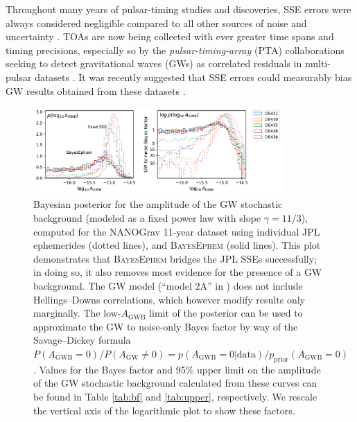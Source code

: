 \documentclass[iop,apj,twocolappendix]{emulateapj}
\begin{document}
Throughout many years of pulsar-timing studies and discoveries, SSE errors were always considered negligible compared to all other sources of noise and uncertainty \citep{1990ApJ...361..300F,2006MNRAS.372.1549E}.
TOAs are now being collected with ever greater time spans and timing precisions, especially so by the \emph{pulsar-timing-array} (PTA) collaborations seeking to detect gravitational waves (GWs) as correlated residuals in multi-pulsar datasets \citep{saz78,det79,fb90,ml13,dcl+16,h13,v+16}.
It was recently suggested that SSE errors could measurably bias GW results obtained from these datasets \citep{2016MNRAS.455.4339T,2019ApJ...876...55R}.
%
\begin{figure}[t]
\begin{center}
    \includegraphics[width=0.85\textwidth]{figures/GWposterior.pdf}
\end{center}
\vspace{-12pt}
    \caption{Bayesian posterior for the amplitude of the GW stochastic background (modeled as a fixed power law with slope $\gamma = 11/3$), computed for the NANOGrav 11-year dataset using individual JPL ephemerides (dotted lines), and \textsc{BayesEphem} (solid lines).
    This plot demonstrates that \textsc{BayesEphem} bridges the JPL SSEs successfully; in doing so, it also removes most evidence for the presence of a GW background.
    The GW model (``model 2A'' in \citealt{2018ApJ...859...47A}) does not include Hellings--Downs correlations, which however modify results only marginally.
    The low-$A_\mathrm{GWB}$ limit of the posterior can be used to approximate the GW to noise-only Bayes factor by way of the Savage--Dickey formula $P(A_\mathrm{GWB}=0)/P(A_\mathrm{GW}\neq 0) = p(A_\mathrm{GWB}=0|\mathrm{data})/p_\mathrm{prior}(A_\mathrm{GWB}=0)$ \citep{d71}. Values for the Bayes factor and 95\% upper limit on the amplitude of the GW stochastic background calculated from these curves can be found in Table \ref{tab:bf} and \ref{tab:upper}, respectively. We rescale the vertical axis of the logarithmic plot to show these factors. 
    \label{fig:posteriors}}
\end{figure}
\end{document}
